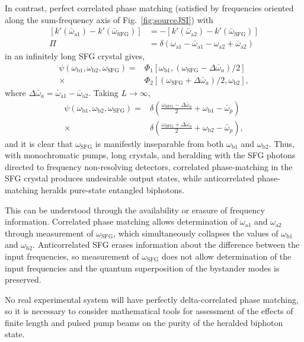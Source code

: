 \documentclass[twocolumn,amssymb, nobibnotes, showpacs, aps, pra,10pt]{revtex4-1}
\newcommand*{\waone}{\omega_{\textrm{a}1}}
\newcommand*{\watwo}{\omega_{\textrm{a}2}}
\newcommand*{\wbone}{\omega_{\textrm{b}1}}
\newcommand*{\wbtwo}{\omega_{\textrm{b}2}}
\newcommand*{\wsfg}{\omega_\textrm{SFG}}
\begin{document}
In contrast, perfect correlated phase matching (satisfied by frequencies oriented along the sum-frequency axis of Fig.\ \ref{fig:sourceJSI}) with 
\begin{align}
\left[ k'(\bar{\omega}_{\text{a}1}) - k'(\bar{\omega}_{\text{SFG}}) \right] &= -[k'(\bar{\omega}_{\text{a}2}) - k'(\bar{\omega}_{\text{SFG}})] \\
\Pi &= \delta \left( \waone - \bar{\omega}_{\text{a1}} - \watwo + \bar{\omega}_{\text{a2}}  \right)
\end{align}
in an infinitely long SFG crystal gives,
\begin{equation}
\begin{split}
\psi(\wbone, \wbtwo,\wsfg) = &\Phi_1 \left[ \wbone , \left(\wsfg - \Delta \bar{\omega}_a\right)/2 \right] \\
\times& \Phi_2 \left[ \left(\wsfg + \Delta \bar{\omega}_a \right)/2,\wbtwo \right],
\end{split}
\end{equation}
where $\Delta \bar{\omega}_a = \bar{\omega}_{\text{a1}} - \bar{\omega}_{\text{a2}}$. Taking $L \to \infty$,
\begin{equation}
\begin{split}
\psi(\wbone, \wbtwo,\wsfg) = & \delta \left( \frac{\wsfg - \Delta \bar{\omega}_a}{2}+\wbone- \bar{\omega}_p \right)  \\
\times& \delta \left( \frac{\wsfg + \Delta \bar{\omega}_a}{2}+\wbtwo - \bar{\omega}_p \right),
\end{split}
\end{equation}
and it is clear that $\wsfg$ is manifestly inseparable from both $\wbone$ and $\wbtwo$. Thus, with monochromatic pumps, long crystals, and heralding with the SFG photons directed to frequency non-resolving detectors, correlated phase-matching in the SFG crystal produces undesirable output states, while anticorrelated phase-matching heralds pure-state entangled biphotons.

This can be understood through the availability or erasure of frequency information. Correlated phase matching allows determination of $\waone$ and $\watwo$ through measurement of $\wsfg$, which simultaneously collapses the values of $\wbone$ and $\wbtwo$. Anticorrelated SFG erases information about the difference between the input frequencies, so measurement of $\wsfg$ does not allow determination of the input frequencies and the quantum superposition of the bystander modes is preserved.

No real experimental system will have perfectly delta-correlated phase matching, so it is necessary to consider mathematical tools for assessment of the effects of finite length and pulsed pump beams on the purity of the heralded biphoton state.
\end{document}
